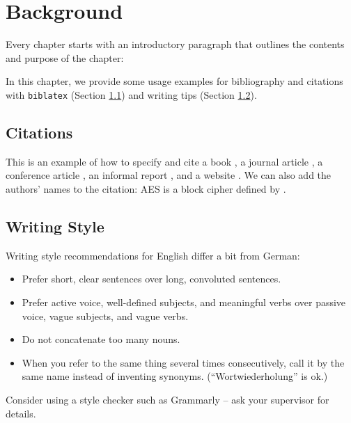 \documentclass[11pt,
  titlepage=false,
]{scrreprt}
\begin{document}

\chapter{Background}
\label{chap:background}

Every chapter starts with an introductory paragraph that outlines the contents and purpose of the chapter:

In this chapter, we provide some usage examples for bibliography and citations with \texttt{biblatex} (Section \ref{sec:bib}) and writing tips (Section \ref{sec:hints}).

\section{Citations}
\label{sec:bib}

This is an example of how to specify and cite
a book \cite{AESbook},
a journal article \cite{bstjShannon49},
a conference article \cite{spKocherHFGGHHLM019},
an informal report \cite{iacrSchneierFKR15},
and a website \cite{webIAIK21}.
We can also add the authors' names to the citation:
AES is a block cipher defined by \textcite{AESbook}.

\section{Writing Style}
\label{sec:hints}

Writing style recommendations for English differ a bit from German:
\begin{itemize}
  \item Prefer short, clear sentences over long, convoluted sentences.
  \item Prefer active voice, well-defined subjects, and meaningful verbs over passive voice, vague subjects, and vague verbs.
  \item Do not concatenate too many nouns.
  \item When you refer to the same thing several times consecutively, call it by the same name instead of inventing synonyms. (``Wortwiederholung'' is ok.)
\end{itemize}
Consider using a style checker such as Grammarly -- ask your supervisor for details.
\end{document}
